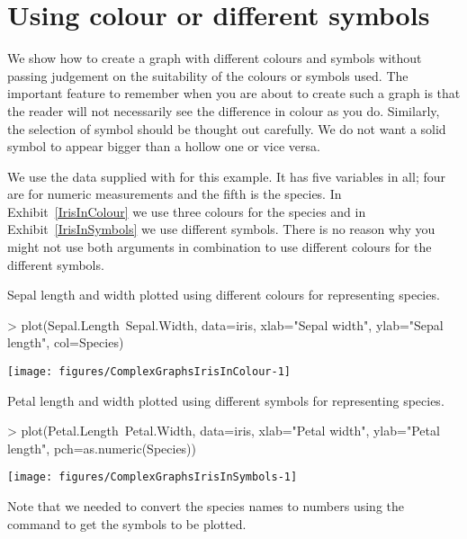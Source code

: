 \section{Using colour or different symbols} 
 
We show how to create a graph with different colours and symbols without passing judgement on the suitability of the colours or symbols used. The important feature to remember when you are about to create such a graph is that the reader will not necessarily see the difference in colour as you do. Similarly, the selection of symbol should be thought out carefully. We do not want a solid symbol to appear bigger than a hollow one or vice versa. 
 
We use the  data supplied with \R{} for this example. It has five variables in all; four are for numeric measurements and the fifth is the species. In Exhibit~\ref{IrisInColour} we use three colours for the species and in Exhibit~\ref{IrisInSymbols} we use different symbols. There is no reason why you might not use both arguments in combination to use different colours for the different symbols. 
 
\begin{exhibit} 
\begin{center} 
\caption{Sepal length and width plotted using different colours for representing species. } 
\label{IrisInColour} 

\begin{Schunk}
\begin{Sinput}
> plot(Sepal.Length~Sepal.Width, data=iris, xlab="Sepal width", ylab="Sepal length", col=Species) 
\end{Sinput}

\texttt{[image: figures/ComplexGraphsIrisInColour-1]} \end{Schunk}


\end{center} 
\end{exhibit} 
 
\begin{exhibit} 
\begin{center} 
\caption{Petal length and width plotted using different symbols for representing species. } 
\label{IrisInSymbols} 

\begin{Schunk}
\begin{Sinput}
> plot(Petal.Length~Petal.Width, data=iris, xlab="Petal width", ylab="Petal length", pch=as.numeric(Species)) 
\end{Sinput}

\texttt{[image: figures/ComplexGraphsIrisInSymbols-1]} \end{Schunk}

\end{center} 
\end{exhibit} 
Note that we needed to convert the species names to numbers using the  command to get the symbols to be plotted. 
 
